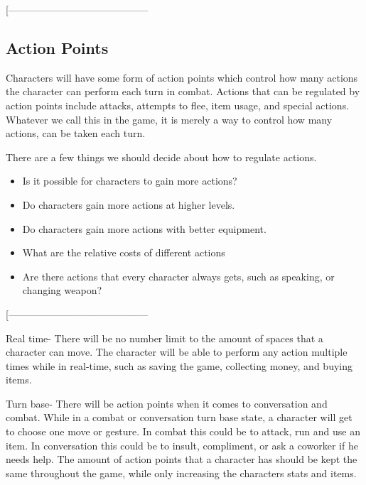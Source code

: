 \documentclass[9pt]{article}
\begin{document}
\smallskip
[------------------------------------------















\subsection*{Action Points}

Characters will have some form of action points which control how 
many actions the character can perform each turn in combat. Actions
that can be regulated by action points include attacks, attempts to 
flee, item usage, and special actions. 
Whatever we call this in the game, it is merely a way to control
how many actions, can be taken each turn. 

There are a few things we should decide about how to regulate actions.
\begin{itemize}
\item Is it possible for characters to gain more actions?
\item Do characters gain more actions at higher levels. 
\item Do characters gain more actions with better equipment.
\item What are the relative costs of different actions 
\item Are there actions that every character always gets, such as speaking, or changing weapon? 
\end{itemize}


\smallskip
[------------------------------------------
\smallskip

Real time- There will be no number limit to the amount of spaces that a character can move. The character will be able to perform any action multiple times while in real-time, such as saving the game, collecting money, and buying items.


Turn base- There will be action points when it comes to conversation and combat. While in a combat or conversation turn base state, a character will get to choose one move or gesture. In combat this could be to attack, run and use an item. In conversation this could be to insult, compliment, or ask a coworker if he needs help. The amount of action points that a character has should be kept the same throughout the game, while only increasing the characters stats and items.
\end{document}
